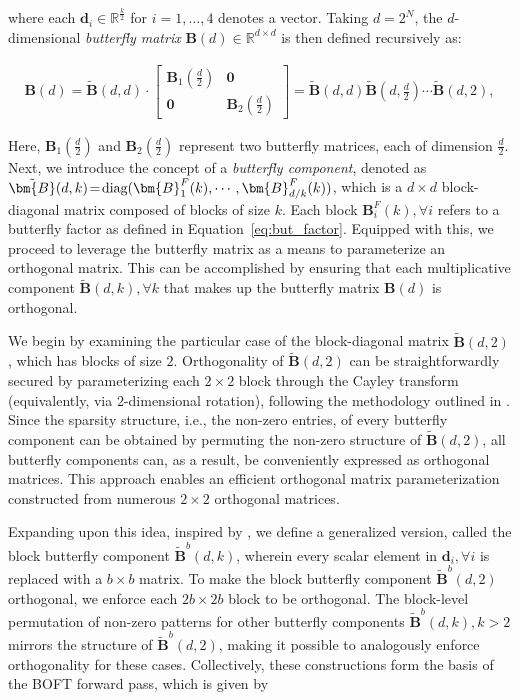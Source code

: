 where each $\bm{d}_i\in\mathbb{R}^{\frac{k}{2}}$ for $i=1,\ldots,4$ denotes a vector. Taking $d=2^N$, the $d$-dimensional \emph{butterfly matrix} $\bm{B}(d)\in\mathbb{R}^{d\times d}$ is then defined recursively as:

\begin{equation}
\begin{aligned}
    \!\!\bm{B}(d)=\tilde{\bm{B}}(d,d)\!\cdot\!\begin{bmatrix}
    \bm{B}_1(\frac{d}{2})\!\!\!\!\! & \bm{0} \\
    \bm{0}\!\!\!\!\! &\bm{B}_2(\frac{d}{2})
    \end{bmatrix}= \tilde{\bm{B}}(d,d)\tilde{\bm{B}}(d,\frac{d}{2})\cdots\tilde{\bm{B}}(d,2),
\end{aligned}
\end{equation}

Here, $\bm{B}_1(\frac{d}{2})$ and $\bm{B}_2(\frac{d}{2})$ represent two butterfly matrices, each of dimension $\frac{d}{2}$. Next, we introduce the concept of a \emph{butterfly component}, denoted as $\thickmuskip=2mu \medmuskip=2mu \tilde{\bm{B}}(d,k)=\text{diag}(\bm{B}^F_1(k),\cdots,\bm{B}^F_{d/k}(k))$, which is a $d\times d$ block-diagonal matrix composed of blocks of size $k$. Each block $\bm{B}^F_i(k), \forall i$ refers to a butterfly factor as defined in Equation~\ref{eq:but_factor}. Equipped with this, we proceed to leverage the butterfly matrix as a means to parameterize an orthogonal matrix. This can be accomplished by ensuring that each multiplicative component $\tilde{\bm{B}}(d,k), \forall k$ that makes up the butterfly matrix $\bm{B}(d)$ is orthogonal. 

We begin by examining the particular case of the block-diagonal matrix $\tilde{\bm{B}}(d,2)$, which has blocks of size $2$. Orthogonality of $\tilde{\bm{B}}(d,2)$ can be straightforwardly secured by parameterizing each $2 \times 2$ block through the Cayley transform (equivalently, via $2$-dimensional rotation), following the methodology outlined in \cite{liu2021orthogonal,qiu2023controlling}. Since the sparsity structure, i.e., the non-zero entries, of every butterfly component can be obtained by permuting the non-zero structure of $\tilde{\bm{B}}(d,2)$, all butterfly components can, as a result, be conveniently expressed as orthogonal matrices. This approach enables an efficient orthogonal matrix parameterization constructed from numerous $2\times 2$ orthogonal matrices.

Expanding upon this idea, inspired by \cite{chen2022pixelated}, we define a generalized version, called the block butterfly component $\tilde{\bm{B}}^b(d,k)$, wherein every scalar element in $\bm{d}_i, \forall i$ is replaced with a $b\times b$ matrix. To make the block butterfly component $\tilde{\bm{B}}^b(d,2)$ orthogonal, we enforce each $2b\times 2b$ block to be orthogonal. The block-level permutation of non-zero patterns for other butterfly components $\tilde{\bm{B}}^b(d,k), k>2$ mirrors the structure of $\tilde{\bm{B}}^b(d,2)$, making it possible to analogously enforce orthogonality for these cases. Collectively, these constructions form the basis of the BOFT forward pass, which is given by

